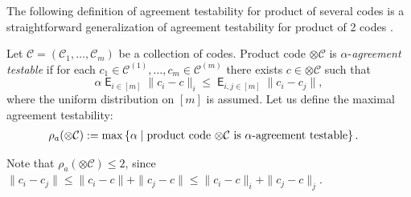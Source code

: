 \documentclass[11pt]{article}
\newcommand{\cC}{\mathcal{C}}
\newcommand{\EE}{\mathop{\mathsf{E}}}
\begin{document}
The following definition of agreement testability for product of several codes is a straightforward generalization of agreement testability for product of 2 codes \cite[Definition 2.8]{Dinur:stoc2022}.
\begin{definition}
    Let $\cC=(\cC_1,\ldots,\cC_m)$ be a collection of codes. Product code $\otimes \cC$ is $\alpha$-\emph{agreement testable} if for each $c_1\in\cC^{(1)},\ldots,c_m\in\cC^{(m)}$ there exists $c\in\otimes\cC$ such that
    \[
    \alpha \EE_{i\in[m]}\|c_i-c\|_i
    \le \EE_{i,j\in[m]}\|c_i-c_j\|,
    \]
    where the uniform distribution on $[m]$ is assumed.
    Let us define the maximal agreement testability:
    \begin{align*}
      \rho_a(\otimes\cC)&:=\max\fbr{\alpha\mid \mbox{product code $\otimes\cC$ is $\alpha$-agreement testable}}.
    \end{align*}
\end{definition}

Note that $\rho_a(\otimes\cC)\le 2$, since $\|c_i-c_j\|\le \|c_i-c\|+\|c_j-c\|\le \|c_i-c\|_i+\|c_j-c\|_j$.
\end{document}
